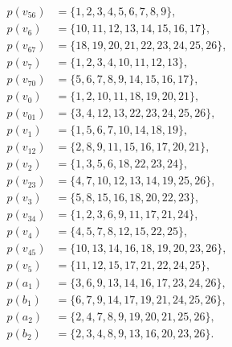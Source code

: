 \documentclass[
  twocolumn,
  aps,
  pra,
  floatfix,
  amsmath,amssymb,
  longbibliography
]{revtex4-2}
\theoremstyle{definition}
\theoremstyle{remark}
\begin{document}
\begin{align*}
p(v_{56}) &= \{1, 2, 3, 4, 5, 6, 7, 8, 9\}, \\
p(v_{6})  &= \{10, 11, 12, 13, 14, 15, 16, 17\}, \\
p(v_{67}) &= \{18, 19, 20, 21, 22, 23, 24, 25, 26\}, \\
p(v_{7})  &= \{1, 2, 3, 4, 10, 11, 12, 13\}, \\
p(v_{70}) &= \{5, 6, 7, 8, 9, 14, 15, 16, 17\}, \\
p(v_{0})  &= \{1, 2, 10, 11, 18, 19, 20, 21\}, \\
p(v_{01}) &= \{3, 4, 12, 13, 22, 23, 24, 25, 26\}, \\
p(v_{1})  &= \{1, 5, 6, 7, 10, 14, 18, 19\}, \\
p(v_{12}) &= \{2, 8, 9, 11, 15, 16, 17, 20, 21\}, \\
p(v_{2})  &= \{1, 3, 5, 6, 18, 22, 23, 24\}, \\
p(v_{23}) &= \{4, 7, 10, 12, 13, 14, 19, 25, 26\}, \\
p(v_{3})  &= \{5, 8, 15, 16, 18, 20, 22, 23\}, \\
p(v_{34}) &= \{1, 2, 3, 6, 9, 11, 17, 21, 24\}, \\
p(v_{4})  &= \{4, 5, 7, 8, 12, 15, 22, 25\}, \\
p(v_{45}) &= \{10, 13, 14, 16, 18, 19, 20, 23, 26\}, \\
p(v_{5})  &= \{11, 12, 15, 17, 21, 22, 24, 25\}, \\[1ex]
p(a_{1})  &= \{3, 6, 9, 13, 14, 16, 17, 23, 24, 26\}, \\
p(b_{1})  &= \{6, 7, 9, 14, 17, 19, 21, 24, 25, 26\}, \\
p(a_{2})  &= \{2, 4, 7, 8, 9, 19, 20, 21, 25, 26\}, \\
p(b_{2})  &= \{2, 3, 4, 8, 9, 13, 16, 20, 23, 26\}.
\end{align*}
\end{document}

